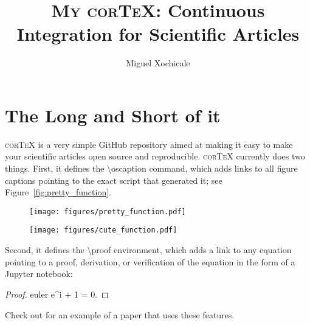 \documentclass[modern]{aastex62}
\begin{document}
\title{\textsc{My corTeX}: Continuous Integration for Scientific Articles}

\author[0000-0002-8225-7517]{Miguel Xochicale}


\section{The Long and Short of it}
\label{sec:intro}
%
\textsc{corTeX} is a very simple \textsf{GitHub} repository aimed at making
it easy to make your scientific articles open source and reproducible.
\textsc{corTeX} currently does two things. First, it defines the
\textsf{\textbackslash oscaption} command, which adds
links to all figure captions pointing to the exact script that generated it;
see Figure~\ref{fig:pretty_function}.
%
\begin{figure}[h!]
    \begin{centering}
    \texttt{[image: figures/pretty\_function.pdf]}
    \end{centering}
\end{figure}

%
\begin{figure}[h!]
    \begin{centering}
    \texttt{[image: figures/cute\_function.pdf]}
    \end{centering}
\end{figure}



Second, it defines the \textsf{\textbackslash proof} environment, which
adds a link to any equation pointing to a proof, derivation, or
verification of the equation in the form of a \textsf{Jupyter} notebook:
\begin{proof}{euler}
    \label{eq:euler}
    e^{i\pi} + 1 = 0.
\end{proof}
Check out \citet{Luger2018} for an example of a paper that uses these
features.

\pagebreak

\end{document}
